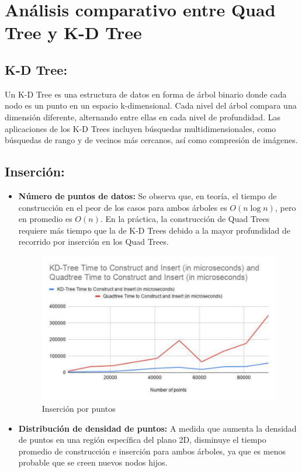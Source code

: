 \documentclass[9pt,a4paper,twoside]{rho-class/rho}
\begin{document}
    \section{Análisis comparativo entre Quad Tree y K-D Tree}
        \subsection*{K-D Tree:}
            Un K-D Tree es una estructura de datos en forma de árbol binario donde cada nodo es un punto en un espacio k-dimensional. Cada nivel del árbol compara una dimensión diferente, alternando entre ellas en cada nivel de profundidad. Las aplicaciones de los K-D Trees incluyen búsquedas multidimensionales, como búsquedas de rango y de vecinos más cercanos, así como compresión de imágenes.
        
        \subsection*{Inserción:}
            \begin{itemize}
            \item \textbf{Número de puntos de datos:} Se observa que, en teoría, el tiempo de construcción en el peor de los casos para ambos árboles es $O(n \log n)$, pero en promedio es $O(n)$. En la práctica, la construcción de Quad Trees requiere más tiempo que la de K-D Trees debido a la mayor profundidad de recorrido por inserción en los Quad Trees.
            \begin{figure}[h]
                \centering
                \includegraphics[width=\linewidth]{figures/Insertion.pdf}
                \caption{Inserción por puntos\cite{amay12_spatialsearch}}
                \label{fig:insertion_p_p_figure}
            \end{figure}
            \item \textbf{Distribución de densidad de puntos:} A medida que aumenta la densidad de puntos en una región específica del plano 2D, disminuye el tiempo promedio de construcción e inserción para ambos árboles, ya que es menos probable que se creen nuevos nodos hijos.
            \end{itemize}
\end{document}
